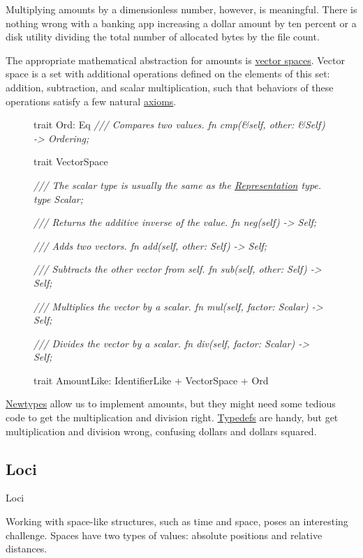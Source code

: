 \documentclass{article}
\begin{document}
Multiplying amounts by a dimensionless number, however, is meaningful.
There is nothing wrong with a banking app increasing a dollar amount by ten percent or a disk utility dividing the total number of allocated bytes by the file count.

The appropriate mathematical abstraction for amounts is \href{https://en.wikipedia.org/wiki/Vector_space}{vector spaces}.
Vector space is a set with additional operations defined on the elements of this set: addition, subtraction, and scalar multiplication, such that behaviors of these operations satisfy a few natural \href{https://en.wikipedia.org/wiki/Vector_space#Definition_and_basic_properties}{axioms}.

\begin{figure}
\begin{code}
trait Ord: Eq {
  \em{/// Compares two values.}
  fn cmp(&self, other: &Self) -> Ordering;
}

trait VectorSpace {
  \em{/// The scalar type is usually the same as the \href{#representation-type}{Representation} type.}
  type Scalar;

  \em{/// Returns the additive inverse of the value.}
  fn neg(self) -> Self;
  
  \em{/// Adds two vectors.}
  fn add(self, other: Self) -> Self;

  \em{/// Subtracts the other vector from self.}
  fn sub(self, other: Self) -> Self;

  \em{/// Multiplies the vector by a scalar.}
  fn mul(self, factor: Scalar) -> Self;

  \em{/// Divides the vector by a scalar.}
  fn div(self, factor: Scalar) -> Self;
}

trait AmountLike: IdentifierLike + VectorSpace + Ord {}
\end{code}
\end{figure}

\href{#newtypes}{Newtypes} allow us to implement amounts, but they might need some tedious code to get the multiplication and division right.
\href{#typdefs}{Typedefs} are handy, but get multiplication and division wrong, confusing dollars and dollars squared.

\subsection{Loci}{Loci}

Working with space-like structures, such as time and space, poses an interesting challenge.
Spaces have two types of values: absolute positions and relative distances.
\end{document}
